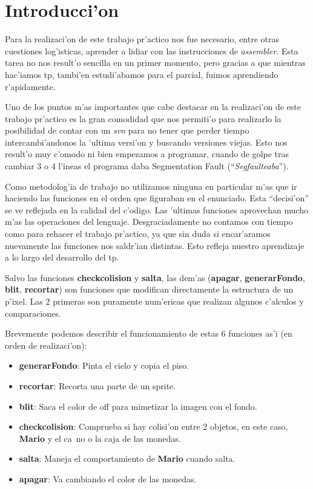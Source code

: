 \section{Introducci'on}

	Para la realizaci'on de este trabajo pr'actico nos fue necesario, entre
otras cuestiones log'isticas, aprender a lidiar con las instrucciones de \textit{assembler}.
Esta tarea no nos result'o sencilla en un primer momento, pero gracias a que
mientras hac'iamos tp, tambi'en estudi'abamos para el parcial, fuimos aprendiendo
r'apidamente.

	Uno de los puntos m'as importantes que cabe destacar en la
realizaci'on de este trabajo pr'actico es la gran comodidad que nos permiti'o
para realizarlo la posibilidad de contar con un \textit{svn} para no tener que perder
tiempo intercambi'andonos la 'ultima versi'on y buscando versiones viejas. Esto
nos result'o muy c'omodo ni bien empezamos a programar, cuando de golpe tras
cambiar 3 o 4 l'ineas el programa daba Segmentation Fault (``\textit{Segfaulteaba}'').

	Como metodolog'ia de trabajo no utilizamos ninguna en particular m'as que
ir haciendo las funciones en el orden que figuraban en el enunciado. Esta
``decisi'on'' se ve reflejada en la calidad del c'odigo. Las 'ultimas funciones
aprovechan mucho m'as las operaciones del lenguaje. Desgraciadamente no
contamos con tiempo como para rehacer el trabajo pr'actico, ya que sin duda si
encar'aramos nuevamente las funciones nos saldr'ian distintas. Esto refleja
nuestro aprendizaje a lo largo del desarrollo del tp.

	Salvo las funciones \textbf{checkcolision} y \textbf{salta}, las dem'as
(\textbf{apagar}, \textbf{generarFondo}, \textbf{blit}, \textbf{recortar}) son
funciones que modifican directamente la estructura de un p'ixel. Las 2 primeras
son puramente num'ericas que realizan algunos c'alculos y comparaciones.

	Brevemente podemos describir el funcionamiento de estas 6 funciones as'i
(en orden de realizaci'on):

\begin{itemize}
	\item \textbf{generarFondo}: Pinta el cielo y copia el piso.
	\item \textbf{recortar}: Recorta una parte de un sprite.
	\item \textbf{blit}: Saca el color de off para mimetizar la imagen con el fondo.
	\item \textbf{checkcolision}: Comprueba si hay colisi'on entre 2 objetos, en este
caso, \textbf{Mario} y el ca~no o la caja de las monedas.
	\item \textbf{salta}: Maneja el comportamiento de \textbf{Mario} cuando salta.
	\item \textbf{apagar}: Va cambiando el color de las monedas.
\end{itemize}

